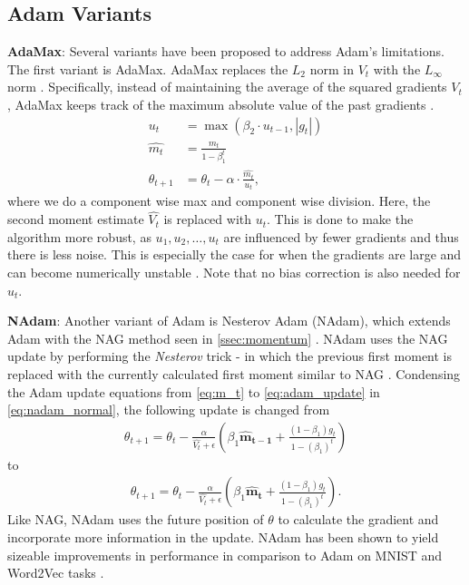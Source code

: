 \subsection{Adam Variants}
\label{ssec:adam_variants}

\textbf{AdaMax}: Several variants have been proposed to address Adam's limitations. The first variant is AdaMax. AdaMax replaces the $L_2$ norm in $V_t$ with the $L_{\infty}$ norm \citep{kingma2014adam}. Specifically, instead of maintaining the average of the squared gradients $V_t$, AdaMax keeps track of the maximum absolute value of the past gradients \citep{kingma2014adam}.
\begin{align}
    u_t &= \max(\beta_2 \cdot u_{t-1}, |g_t|) \\ 
    \hat{m_t} &= \frac{m_t}{1 - \beta_1^t} \\
    \theta_{t+1} &= \theta_t - \alpha \cdot \frac{\hat{m_t}}{u_t},
\end{align}
where we do a component wise max and component wise division. Here, the second moment estimate $\hat{V_t}$ is replaced with $u_t$. This is done to make the algorithm more robust, as $u_1, u_2, \dots, u_t$ are influenced by fewer gradients and thus there is less noise. This is especially the case for when the gradients are large and can become numerically unstable \citep{kingma2014adam}. Note that no bias correction is also needed for $u_t$.

\textbf{NAdam}: Another variant of Adam is Nesterov Adam (NAdam), which extends Adam with the NAG method seen in \cref{ssec:momentum} \citep{dozat2016nadam}. NAdam uses the NAG update by performing the \textit{Nesterov} trick - in which the previous first moment is replaced with the currently calculated first moment similar to NAG \citep{nesterov1983method,dozat2016nadam}. Condensing the Adam update equations from \cref{eq:m_t} to \cref{eq:adam_update} in \cref{eq:nadam_normal}, the following update is changed from 
\begin{align}
    \theta_{t+1} = \theta_t - \frac{\alpha}{{\hat{V_t}} + \epsilon} \left( \beta_1 \mathbf{\hat{m}_{t-1}} + \frac{(1 - \beta_1)g_t}{1 - (\beta_1)^t} \right) \label{eq:nadam_normal}
\end{align}
to 
\begin{align}
    \theta_{t+1} = \theta_t - \frac{\alpha}{{\hat{V_t}} + \epsilon} \left( \beta_1 \mathbf{\hat{m}_{t}} + \frac{(1 - \beta_1)g_t}{1 - (\beta_1)^t} \right).
\end{align}
Like NAG, NAdam uses the future position of $\theta$ to calculate the gradient and incorporate more information in the update. NAdam has been shown to yield sizeable improvements in performance in comparison to Adam on MNIST and Word2Vec tasks \citep{dozat2016nadam}.

